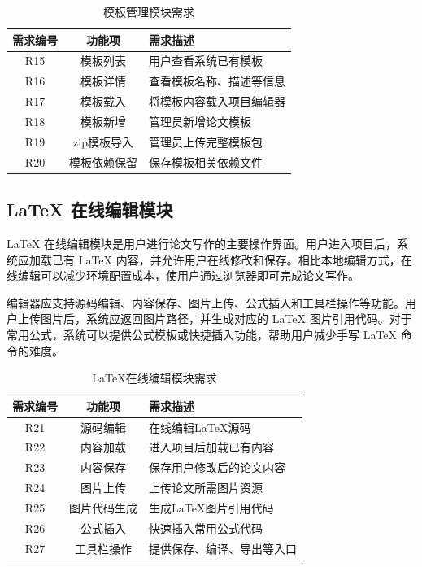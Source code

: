 \documentclass{xduugthesis}
\begin{document}
\begin{table}[H]
    \centering
    \caption{模板管理模块需求}
    \label{tab:template-requirement}
    \begin{tabular}{|c|c|p{7cm}|}
        \hline
        需求编号 & 功能项 & 需求描述 \\
        \hline
        R15 & 模板列表 & 用户查看系统已有模板 \\
        \hline
        R16 & 模板详情 & 查看模板名称、描述等信息 \\
        \hline
        R17 & 模板载入 & 将模板内容载入项目编辑器 \\
        \hline
        R18 & 模板新增 & 管理员新增论文模板 \\
        \hline
        R19 & zip模板导入 & 管理员上传完整模板包 \\
        \hline
        R20 & 模板依赖保留 & 保存模板相关依赖文件 \\
        \hline
    \end{tabular}
\end{table}

\subsection{LaTeX 在线编辑模块}
LaTeX 在线编辑模块是用户进行论文写作的主要操作界面。用户进入项目后，系统应加载已有 LaTeX 内容，并允许用户在线修改和保存。相比本地编辑方式，在线编辑可以减少环境配置成本，使用户通过浏览器即可完成论文写作。

编辑器应支持源码编辑、内容保存、图片上传、公式插入和工具栏操作等功能。用户上传图片后，系统应返回图片路径，并生成对应的 LaTeX 图片引用代码。对于常用公式，系统可以提供公式模板或快捷插入功能，帮助用户减少手写 LaTeX 命令的难度。

\begin{table}[H]
    \centering
    \caption{LaTeX在线编辑模块需求}
    \label{tab:latex-editor-requirement}
    \begin{tabular}{|c|c|p{7cm}|}
        \hline
        需求编号 & 功能项 & 需求描述 \\
        \hline
        R21 & 源码编辑 & 在线编辑LaTeX源码 \\
        \hline
        R22 & 内容加载 & 进入项目后加载已有内容 \\
        \hline
        R23 & 内容保存 & 保存用户修改后的论文内容 \\
        \hline
        R24 & 图片上传 & 上传论文所需图片资源 \\
        \hline
        R25 & 图片代码生成 & 生成LaTeX图片引用代码 \\
        \hline
        R26 & 公式插入 & 快速插入常用公式代码 \\
        \hline
        R27 & 工具栏操作 & 提供保存、编译、导出等入口 \\
        \hline
    \end{tabular}
\end{table}
\end{document}
